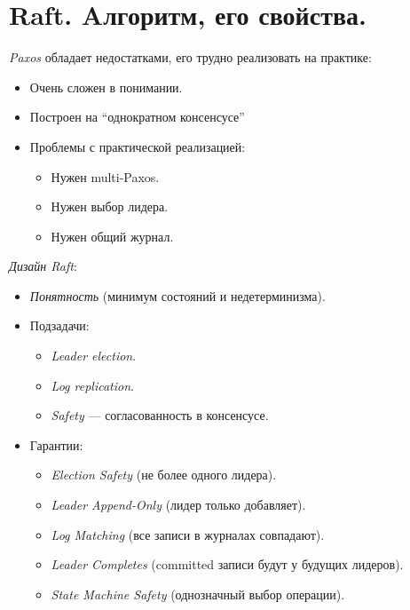 \section{Raft. Aлгоритм, его свойства.}

\begin{remark}
    \textit{Paxos} обладает недостатками,
    его трудно реализовать на практике:
    \begin{itemize}
        \item Очень сложен в понимании.
        \item Построен на ``однократном консенсусе''
        \item Проблемы с практической реализацией:
            \begin{itemize}
                \item Нужен multi-Paxos.
                \item Нужен выбор лидера.
                \item Нужен общий журнал.
            \end{itemize}
    \end{itemize}
\end{remark}

\begin{definition} \textit{Дизайн Raft}:
    \begin{itemize}
        \item \textit{Понятность} (минимум состояний и недетерминизма).
        \item Подзадачи:
            \begin{itemize}
                \item \textit{Leader election}.
                \item \textit{Log replication}.
                \item \textit{Safety} --- согласованность в консенсусе.
            \end{itemize}
        \item Гарантии:
            \begin{itemize}
                \item \textit{Election Safety} (не более одного лидера).
                \item \textit{Leader Append-Only} (лидер только добавляет).
                \item \textit{Log Matching} (все записи в журналах совпадают).
                \item \textit{Leader Completes} (committed записи будут у будущих лидеров).
                \item \textit{State Machine Safety} (однозначный выбор операции).
            \end{itemize}
    \end{itemize}
\end{definition}

